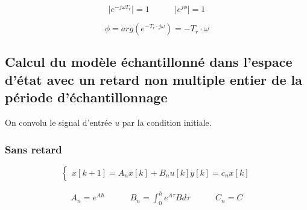 \documentclass[document.tex]{subfiles}
\begin{document}
$$
	\vert e^{-j\omega T_r} \vert = 1 \quad \quad \quad \vert e^{j \phi} \vert = 1
$$

$$
\phi = arg(e^{-T_r \cdot j \omega}) = -T_r \cdot \omega
$$


\subsection{Calcul du modèle échantillonné dans l'espace d'état avec un retard non multiple entier de la période d'échantillonnage}



On convolu le signal d'entrée $u$ par la condition initiale.


\subsubsection{Sans retard}

$$
\begin{cases}
x[k+1] = A_n x[k] + B_n u[k]
y[k] = c_n x[k]
\end{cases}
$$

$$
\begin{array}{l}
\boxed{A_n = e^{A h}} \quad \quad \quad \boxed{B_n = \int^h_0 e^{A \tau} B d\tau} \quad \quad  \quad \boxed{C_n = C}
\end{array}
$$
\end{document}
